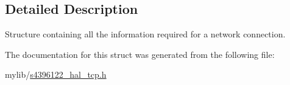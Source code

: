 \subsection{Detailed Description}
Structure containing all the information required for a network connection. 

The documentation for this struct was generated from the following file\+:\begin{DoxyCompactItemize}
\item 
mylib/\hyperlink{s4396122__hal__tcp_8h}{s4396122\+\_\+hal\+\_\+tcp.\+h}\end{DoxyCompactItemize}
